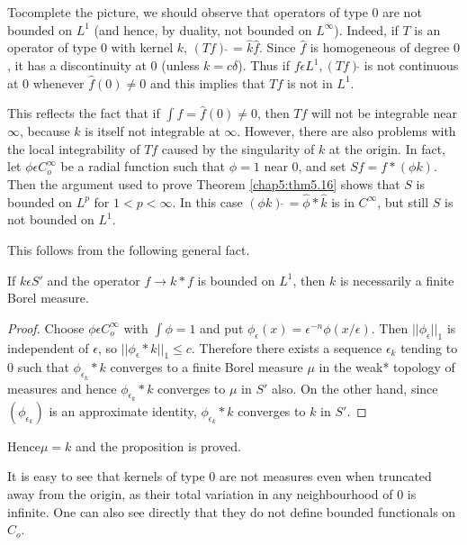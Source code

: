  To\pageoriginale complete the picture,  we should observe that operators of type
 $0$ are not bounded on $L^1$ (and hence,  by duality, not bounded on
 $L^\infty$). Indeed,  if $T$ is an operator of type $0$ with kernel
 $k$, $(Tf)\hat{~} = \hat{k} \hat{f}$.  Since $\hat{f}$ is homogeneous
 of degree $0$, it has a discontinuity at $0$ (unless $k = c
 \delta$). Thus if $f \epsilon L^1, (Tf)\hat{}$ is  not continuous
 at $0$ whenever $\hat{f} (0) \neq 0$ and this implies that $Tf$ is
 not in $L^1$. 
 
 This reflects the fact that if $\int f = \hat{f} (0) \neq 0$, then
 $Tf$ will not be integrable near $\infty$,  because $k$ is itself not
 integrable at $\infty$. However,  there are also problems with the
 local integrability of $Tf$ caused by the singularity of $k$ at the
 origin.  In  fact, let $\phi \epsilon C^\infty_{o}$ be a radial
 function such that $\phi =1$ near 0,  and set $Sf = f * (\phi k)$.
 Then the argument used to prove Theorem \ref{chap5:thm5.16} shows that $S$ is
 bounded on $L^p$ for $1 < p < \infty$.  In this case $(\phi k) \hat{~}
 =  \hat{\phi} * \hat{k}$ is in $C^\infty$,  but still $S$ is not
 bounded on $L^1$. 
 
 This follows from the following general fact.

\setcounter{prop}{19}
 \begin{prop}%
   If $k \epsilon S'$ and the operator $ f \to k * f$ is bounded
   on $L^1$,  then $k$ is necessarily a finite Borel measure.  
 \end{prop}

\begin{proof}
   Choose $\phi \epsilon C_o ^\infty$ with $\int \phi =1$ and put
   $\phi _{\epsilon} (x) = \epsilon^{-n} \phi (x /
   \epsilon)$. Then $|| \phi _{\epsilon}||_1$ is independent of
   $\epsilon$,  so $|| \phi _{\epsilon} * k ||_1 \leq c$.
   Therefore there exists a sequence $\epsilon_{k}$ tending to $0$
   such that $\phi _{\epsilon_k} * k$ converges to a finite Borel
   measure $\mu$ in the weak* topology of measures and hence
   $\phi_{\epsilon_k}* k$ converges to $\mu$ in $S'$ also.  On the
   other hand, since $(\phi _{\epsilon_k})$ is an approximate
   identity, $\phi_{\epsilon_k} * k$ converges to $k$ in $S'$. 
\end{proof}  

Hence\pageoriginale $\mu = k$ and the proposition is proved.

It is easy to see that kernels of type 0 are not measures even when
truncated away from the origin, as their total variation in any
neighbourhood of 0 is infinite. One can also see directly that they
do not define bounded functionals on $C_o$. 

